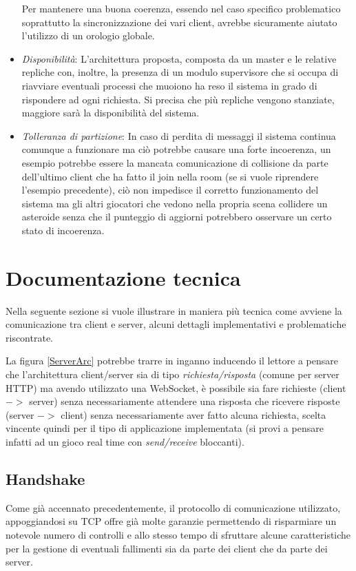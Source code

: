 \documentclass[paper=a4, fontsize=11pt]{scrartcl} %
\numberwithin{equation}{section} %
\numberwithin{figure}{section} %
\numberwithin{table}{section} %
\begin{document}
\begin{itemize}
Per mantenere una buona coerenza, essendo nel caso specifico problematico soprattutto la sincronizzazione dei vari client, avrebbe sicuramente aiutato l'utilizzo di un orologio globale.
\item \textit{Disponibilità}: L'architettura proposta, composta da un master e le relative repliche con, inoltre, la presenza di un modulo supervisore che si occupa di riavviare eventuali processi che muoiono ha reso il sistema in grado di rispondere ad ogni richiesta. Si precisa che più repliche vengono stanziate, maggiore sarà la disponibilità del sistema.
\item \textit{Tolleranza di partizione}: In caso di perdita di messaggi il sistema continua comunque a funzionare ma ciò potrebbe causare una forte incoerenza, un esempio potrebbe essere la mancata comunicazione di collisione da parte dell'ultimo client che ha fatto il join nella room (se si vuole riprendere l'esempio precedente), ciò non impedisce il corretto funzionamento del sistema ma gli altri giocatori che vedono nella propria scena collidere un asteroide senza che il punteggio di aggiorni potrebbero osservare un certo stato di incoerenza.
\end{itemize}

\section{Documentazione tecnica}
Nella seguente sezione si vuole illustrare in maniera più tecnica come avviene la comunicazione tra client e server, alcuni dettagli implementativi e problematiche riscontrate.

La figura \ref{ServerArc} potrebbe trarre in inganno inducendo il lettore a pensare che l'architettura client/server sia di tipo \textit{richiesta/risposta} (comune per server HTTP) ma avendo utilizzato una WebSocket, è possibile sia fare richieste (client $->$ server) senza necessariamente attendere una risposta che ricevere risposte (server $->$ client) senza necessariamente aver fatto alcuna richiesta, scelta vincente quindi per il tipo di applicazione implementata (si provi a pensare infatti ad un gioco real time con \textit{send/receive} bloccanti).

\subsection{Handshake}
Come già accennato precedentemente, il protocollo di comunicazione utilizzato, appoggiandosi su TCP offre già molte garanzie permettendo di risparmiare un notevole numero di controlli e allo stesso tempo di sfruttare alcune caratteristiche per la gestione di eventuali fallimenti sia da parte dei client che da parte dei server.
\end{document}
